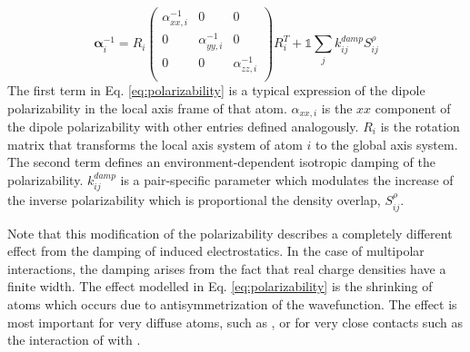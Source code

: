 \documentclass[journal=jctcce,manuscript=article]{achemso}
\begin{document}
\begin{equation}
  \bm{\alpha}^{-1}_i=
  R_i\begin{pmatrix}
    \alpha^{-1}_{xx,i} & 0 & 0 \\
    0 & \alpha^{-1}_{yy,i} & 0 \\
    0 & 0 & \alpha^{-1}_{zz,i} \\
  \end{pmatrix}R_i^T
    +\mathds{1}\sum_{j}k^{damp}_{ij}S_{ij}^\rho
    \label{eq:polarizability}
\end{equation}
\noindent
The first term in Eq. \ref{eq:polarizability} is a typical expression of the dipole polarizability in the local axis frame of that atom. $\alpha_{xx,i}$ is the $xx$ component of the dipole polarizability with other entries defined analogously. $R_i$ is the rotation matrix that transforms the local axis system of atom $i$ to the global axis system. The second term defines an environment-dependent isotropic damping of the polarizability. $k_{ij}^{damp}$ is a pair-specific parameter which modulates the increase of the inverse polarizability which is proportional the density overlap, $S_{ij}^\rho$.

Note that this modification of the polarizability describes a completely different effect from the damping of induced electrostatics. In the case of multipolar interactions, the damping arises from the fact that real charge densities have a finite width. The effect modelled in Eq. \ref{eq:polarizability} is the shrinking of atoms which occurs due to antisymmetrization of the wavefunction. The effect is most important for very diffuse atoms, such as , or for very close contacts such as the interaction of  with .

\end{document}
